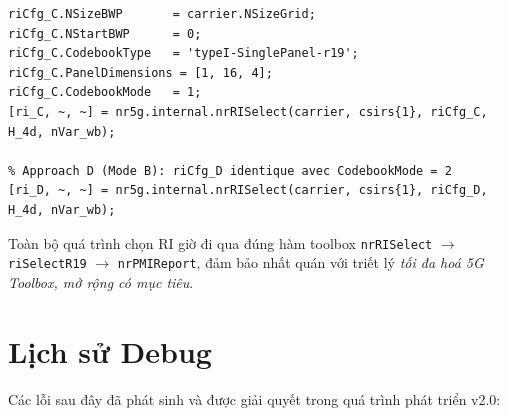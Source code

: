\documentclass[11pt,a4paper]{article}
\begin{document}
\begin{lstlisting}[style=matlab]
% Approach C (Mode A)
riCfg_C.NSizeBWP       = carrier.NSizeGrid;
riCfg_C.NStartBWP      = 0;
riCfg_C.CodebookType   = 'typeI-SinglePanel-r19';
riCfg_C.PanelDimensions = [1, 16, 4];
riCfg_C.CodebookMode   = 1;
[ri_C, ~, ~] = nr5g.internal.nrRISelect(carrier, csirs{1}, riCfg_C, H_4d, nVar_wb);

% Approach D (Mode B): riCfg_D identique avec CodebookMode = 2
[ri_D, ~, ~] = nr5g.internal.nrRISelect(carrier, csirs{1}, riCfg_D, H_4d, nVar_wb);
\end{lstlisting}

Toàn bộ quá trình chọn RI giờ đi qua đúng hàm toolbox
\texttt{nrRISelect} $\to$ \texttt{riSelectR19} $\to$ \texttt{nrPMIReport},
đảm bảo nhất quán với triết lý \emph{tối đa hoá 5G Toolbox, mở rộng có mục tiêu}.

\FloatBarrier
\section{Lịch sử Debug}

Các lỗi sau đây đã phát sinh và được giải quyết trong quá trình phát triển v2.0:
\end{document}

